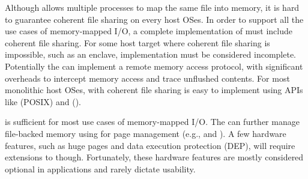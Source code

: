

Although  allows multiple processes to map the same file into memory, it is hard to guarantee coherent file sharing on every host OSes.
In order to support all the use cases of memory-mapped I/O,
a complete implementation of \thehostabi{}
must include coherent file sharing. 
For some host target where coherent file sharing is impossible,
such as an \sgx{} enclave,
\thehostabi{} implementation must be considered incomplete.
Potentially the \libos{} can implement a remote memory access protocol, with significant overheads to intercept memory access and trace unflushed contents.  
For most monolithic host OSes,
 with coherent file sharing
is easy to implement using APIs like  (POSIX) and  (\win{}).
 


 is sufficient for most use cases of memory-mapped I/O. The \libos{} can further manage file-backed memory using \hostapis{} for page management (e.g.,  and ). A few hardware features, such as huge pages and data execution protection (DEP), will require extensions to \thehostabi{} though.
Fortunately, these hardware features are mostly considered optional in applications
and rarely dictate usability.












